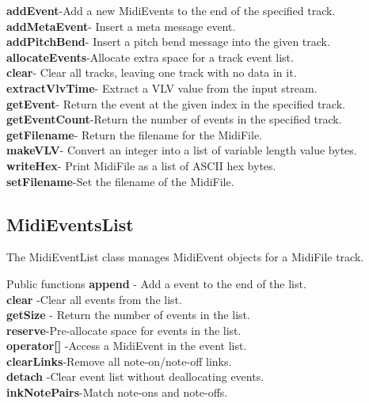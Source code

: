 \documentclass[12pt,a4paper]{article}
\begin{document}
 \textbf{addEvent}-Add a new MidiEvents to the end of the specified track.\\
  \textbf{addMetaEvent}- Insert a meta message event.\\
  \textbf{addPitchBend}- Insert a pitch bend message into the given track.\\
  \textbf{allocateEvents}-Allocate extra space for a track event list.\\
  \textbf{clear}- Clear all tracks, leaving one track with no data in it.\\
  \textbf{extractVlvTime}- Extract a VLV value from the input stream.\\
  \textbf{getEvent}- Return the event at the given index in the specified track.\\
  \textbf{getEventCount}-Return the number of events in the specified track.\\
  \textbf{getFilename}- Return the filename for the MidiFile.\\
  \textbf{makeVLV}- Convert an integer into a list of variable length value bytes.\\
  \textbf{writeHex}- Print MidiFile as a list of ASCII hex bytes.\\
  \textbf{setFilename}-Set the filename of the MidiFile.\\
 
 \subsection{MidiEventsList }
 The MidiEventList class manages MidiEvent objects for a MidiFile track.

 

Public functions
  \textbf{append }- Add a event to the end of the list. \\
 \textbf{ clear} -Clear all events from the list.\\
  \textbf{getSize} - Return the number of events in the list.\\
  \textbf{reserve}-Pre-allocate space for events in the list.\\
  \textbf{operator[] }-Access a MidiEvent in the event list.\\
  \textbf{clearLinks}-Remove all note-on/note-off links.\\
  \textbf{detach} -Clear event list without deallocating events.\\
\textbf{inkNotePairs}-Match note-ons and note-offs.\\
  
\end{document}
